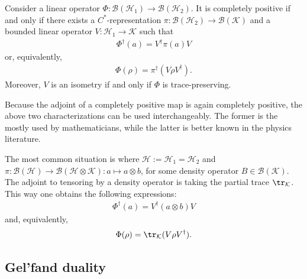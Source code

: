     \begin{theorem}[Stinespring]\label{operators:stinespring}
        Consider a linear operator $\Phi:\mathcal{B}(\mathcal{H}_1)\rightarrow\mathcal{B}(\mathcal{H}_2)$. It is completely positive if and only if there exists a $C^*$-representation $\pi:\mathcal{B}(\mathcal{H}_2)\rightarrow\mathcal{B}(\mathcal{K})$ and a bounded linear operator $V:\mathcal{H}_1\rightarrow\mathcal{K}$ such that
        \begin{gather}
            \Phi^\dagger(a) = V^\dag\pi(a)V
        \end{gather}
        or, equivalently,
        \begin{gather}
            \Phi(\rho) = \pi^\dagger(V\rho V^\dagger).
        \end{gather}
        Moreover, $V$ is an isometry if and only if $\Phi$ is trace-preserving.
    \end{theorem}
    \begin{remark}
        Because the adjoint of a completely positive map is again completely positive, the above two characterizations can be used interchangeably. The former is the mostly used by mathematicians, while the latter is better known in the physics literature.

        The most common situation is where $\mathcal{H}:=\mathcal{H}_1=\mathcal{H}_2$ and $\pi:\mathcal{B}(\mathcal{H})\rightarrow\mathcal{B}(\mathcal{H}\otimes\mathcal{K}):a\mapsto a\otimes b$, for some density operator $B\in\mathcal{B}(\mathcal{K})$. The adjoint to tensoring by a density operator is taking the partial trace $\tr_\mathcal{K}$. This way one obtains the following expressions:
        \begin{gather}
            \Phi^\dagger(a) = V^\dag(a\otimes b)V
        \end{gather}
        and, equivalently,
        \begin{gather}
            \Phi(\rho) = \tr_\mathcal{K}(V\rho V^\dagger).
        \end{gather}
    \end{remark}

\subsection{Gel'fand duality}

